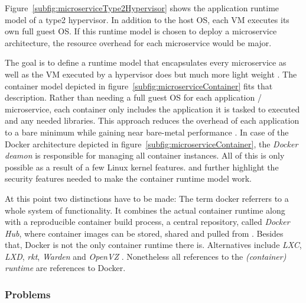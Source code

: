 Figure~\ref{subfig:microserviceType2Hypervisor} shows the application runtime
model of a type2 hypervisor. In addition to the host \ac{OS}, each \ac{VM}
executes its own full guest \ac{OS}. If this runtime model is chosen to deploy
a microservice architecture, the resource overhead for each microservice would
be major.

The goal is to define a runtime model that encapsulates every microservice as
well as the \ac{VM} executed by a hypervisor does but much more light weight
\autocite{SchenkerLearnDockerFundamentals2018}. The container model depicted in
figure~\ref{subfig:microserviceContainer} fits that description. Rather than
needing a full guest \ac{OS} for each application / microservice, each
container only includes the application it is tasked to executed and any needed
libraries. This approach reduces the overhead of each application to a bare
minimum while gaining near bare-metal performance \autocite[Ch.
1A]{CombeDockerNotDocker2016}. In case of the Docker architecture depicted in
figure~\ref{subfig:microserviceContainer}, the \textit{Docker deamon} is
responsible for managing all container instances. All of this is only possible
as a result of a few Linux kernel features. \autocite{CombeDockerNotDocker2016}
and \autocite[Ch. 1.2.1]{LuksaKubernetesAction2017} further highlight the
security features needed to make the container runtime model work.

At this point two distinctions have to be made: The term docker referrers to a
whole system of functionality. It combines the actual container runtime along
with a reproducible container build process, a central repository, called
\textit{Docker Hub}, where container images can be stored, shared and pulled
from \autocite[Ch. 1B]{CombeDockerNotDocker2016}. Besides that, Docker is not
the only container runtime there is. Alternatives include \textit{LXC},
\textit{LXD}, \textit{rkt}, \textit{Warden} and \textit{OpenVZ} \autocite[Tab.
1]{CombeDockerNotDocker2016}. Nonetheless all references to the
\textit{(container) runtime} are references to Docker.

\subsubsection{Problems}%
\label{ssub:Problems}


